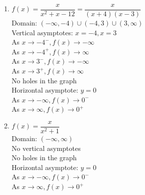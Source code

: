 \begin{multicols}{2}
\begin{enumerate}
\setcounter{enumi}{\value{HW}}

\item $f(x) = \dfrac{x}{x^{2} + x - 12} = \dfrac{x}{(x + 4)(x - 3)}$\\
Domain: $(-\infty, -4) \cup (-4, 3) \cup (3, \infty)$\\
Vertical asymptotes: $x = -4, x = 3$\\
As $x \rightarrow -4^{-}, f(x) \rightarrow -\infty$\\
As $x \rightarrow -4^{+}, f(x) \rightarrow \infty$\\
As $x \rightarrow 3^{-}, f(x) \rightarrow -\infty$\\
As $x \rightarrow 3^{+}, f(x) \rightarrow \infty$\\
No holes in the graph\\
Horizontal asymptote: $y = 0$ \\
As $x \rightarrow -\infty, f(x) \rightarrow 0^{-}$\\
As $x \rightarrow \infty, f(x) \rightarrow 0^{+}$\\

\vfill

\columnbreak


\item $f(x) = \dfrac{x}{x^{2} + 1}$\\
Domain: $(-\infty, \infty)$\\
No vertical asymptotes\\
No holes in the graph\\
Horizontal asymptote: $y = 0$ \\
As $x \rightarrow -\infty, f(x) \rightarrow 0^{-}$\\
As $x \rightarrow \infty, f(x) \rightarrow 0^{+}$\\

\setcounter{HW}{\value{enumi}}
\end{enumerate}
\end{multicols}

